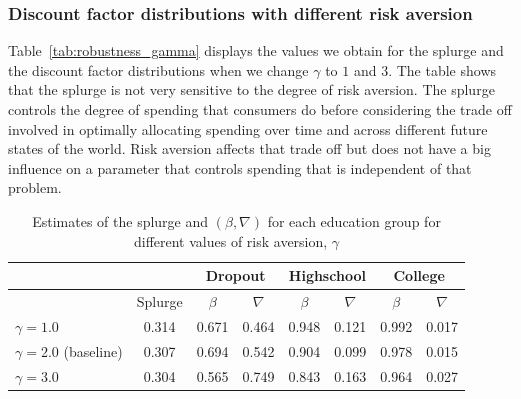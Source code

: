 \documentclass[\econtexRoot/EGMN]{subfiles}
\begin{document}
\subsubsection{Discount factor distributions with different risk aversion}
\notinsubfile{\label{sec:robust_gamma_estim}}

Table~\ref{tab:robustness_gamma} displays the values we obtain for the splurge and the discount factor distributions when we change $\gamma$ to $1$ and $3$. The table shows that the splurge is not very sensitive to the degree of risk aversion. The splurge controls the degree of spending that consumers do before considering the trade off involved in optimally allocating spending over time and across different future states of the world. Risk aversion affects that trade off but does not have a big influence on a parameter that controls spending that is independent of that problem.

\begin{table}[t]
    \begin{center}
        \begin{tabular}{lc|cccccc}
            \toprule
                                      &         & \multicolumn{2}{c}{Dropout} & \multicolumn{2}{c}{Highschool} & \multicolumn{2}{c}{College}                                 \\ \midrule
                                      & Splurge & $\beta$                     & $\nabla$                       & $\beta$                     & $\nabla$ & $\beta$ & $\nabla$ \\ \midrule
            $\gamma = 1.0$            & 0.314   & 0.671                       & 0.464                          & 0.948                       & 0.121    & 0.992   & 0.017    \\
            $\gamma = 2.0$ (baseline) & 0.307   & 0.694                       & 0.542                          & 0.904                       & 0.099    & 0.978   & 0.015    \\
            $\gamma = 3.0$            & 0.304   & 0.565                       & 0.749                          & 0.843                       & 0.163    & 0.964   & 0.027
            \\ \bottomrule
        \end{tabular}
        \caption{Estimates of the splurge and $(\beta,\nabla)$ for each education group for different values of risk aversion, $\gamma$}
        \notinsubfile{\label{tab:robustness_gamma}}
    \end{center}
\end{table}
\end{document}
